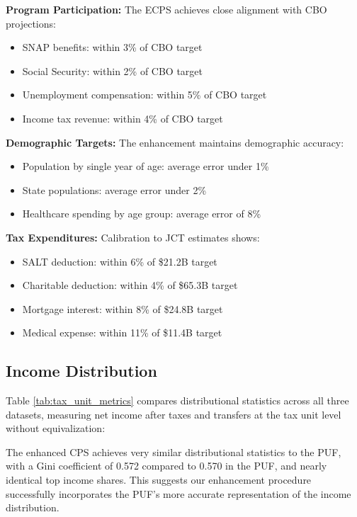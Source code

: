 \textbf{Program Participation:} The ECPS achieves close alignment with CBO projections:
\begin{itemize}
    \item SNAP benefits: within 3\% of CBO target
    \item Social Security: within 2\% of CBO target
    \item Unemployment compensation: within 5\% of CBO target
    \item Income tax revenue: within 4\% of CBO target
\end{itemize}

\textbf{Demographic Targets:} The enhancement maintains demographic accuracy:
\begin{itemize}
    \item Population by single year of age: average error under 1\%
    \item State populations: average error under 2\%
    \item Healthcare spending by age group: average error of 8\%
\end{itemize}

\textbf{Tax Expenditures:} Calibration to JCT estimates shows:
\begin{itemize}
    \item SALT deduction: within 6\% of \$21.2B target
    \item Charitable deduction: within 4\% of \$65.3B target
    \item Mortgage interest: within 8\% of \$24.8B target
    \item Medical expense: within 11\% of \$11.4B target
\end{itemize}

\subsection{Income Distribution}

Table \ref{tab:tax_unit_metrics} compares distributional statistics across all three datasets, measuring net income after taxes and transfers at the tax unit level without equivalization:



The enhanced CPS achieves very similar distributional statistics to the PUF, with a Gini coefficient of 0.572 compared to 0.570 in the PUF, and nearly identical top income shares. This suggests our enhancement procedure successfully incorporates the PUF's more accurate representation of the income distribution. 

